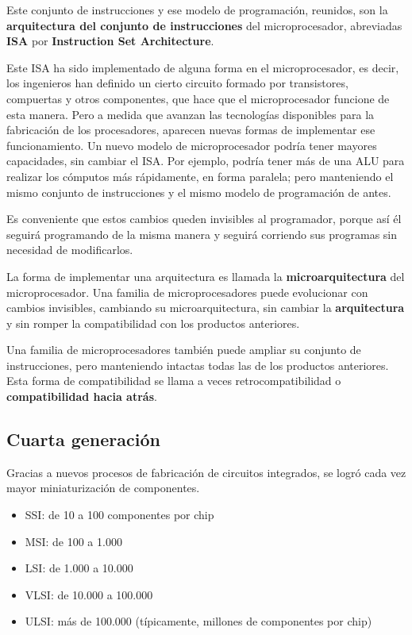 \documentclass[spanish,A4,]{article}
\begin{document}
Este conjunto de instrucciones y ese modelo de programación, reunidos,
son la \textbf{arquitectura del conjunto de instrucciones} del
microprocesador, abreviadas \textbf{ISA} por \textbf{Instruction Set
Architecture}.

Este ISA ha sido implementado de alguna forma en el microprocesador, es
decir, los ingenieros han definido un cierto circuito formado por
transistores, compuertas y otros componentes, que hace que el
microprocesador funcione de esta manera. Pero a medida que avanzan las
tecnologías disponibles para la fabricación de los procesadores,
aparecen nuevas formas de implementar ese funcionamiento. Un nuevo
modelo de microprocesador podría tener mayores capacidades, sin cambiar
el ISA. Por ejemplo, podría tener más de una ALU para realizar los
cómputos más rápidamente, en forma paralela; pero manteniendo el mismo
conjunto de instrucciones y el mismo modelo de programación de antes.

Es conveniente que estos cambios queden invisibles al programador,
porque así él seguirá programando de la misma manera y seguirá corriendo
sus programas sin necesidad de modificarlos.

La forma de implementar una arquitectura es llamada la
\textbf{microarquitectura} del microprocesador. Una familia de
microprocesadores puede evolucionar con cambios invisibles, cambiando su
microarquitectura, sin cambiar la \textbf{arquitectura} y sin romper la
compatibilidad con los productos anteriores.

Una familia de microprocesadores también puede ampliar su conjunto de
instrucciones, pero manteniendo intactas todas las de los productos
anteriores. Esta forma de compatibilidad se llama a veces
retrocompatibilidad o \textbf{compatibilidad hacia atrás}.

\subsection{Cuarta generación}\label{cuarta-generaciuxf3n}

Gracias a nuevos procesos de fabricación de circuitos integrados, se
logró cada vez mayor miniaturización de componentes.

\begin{itemize}
\itemsep1pt\parskip0pt
\item
  SSI: de 10 a 100 componentes por chip
\item
  MSI: de 100 a 1.000
\item
  LSI: de 1.000 a 10.000
\item
  VLSI: de 10.000 a 100.000
\item
  ULSI: más de 100.000 (típicamente, millones de componentes por chip)
\end{itemize}
\end{document}
